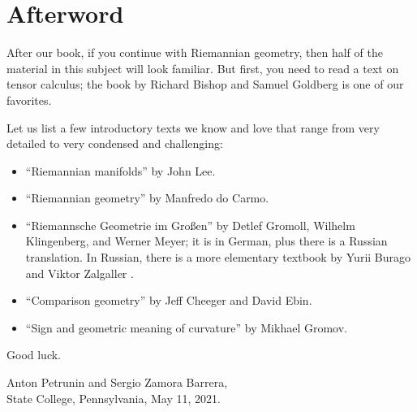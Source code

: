 \chapter{Afterword}

After our book, if you continue with Riemannian geometry,
then half of the material in this subject will look familiar.
But first, you need to read a text on tensor calculus;
the book by Richard Bishop and Samuel Goldberg \cite{bishop-goldberg} is one of our favorites.

Let us list a few introductory texts we know and love that range from very detailed to very condensed and challenging:
\begin{itemize}
\item ``Riemannian manifolds''  \cite{lee2006riemannian} by John Lee.
\item ``Riemannian geometry'' \cite{carmo1992riemannian} by Manfredo do Carmo.
\item ``Riemannsche Geometrie im Großen'' \cite{gromoll-klingenberg-meyer} by 
Detlef Gromoll,
Wilhelm Klingenberg, 
and  Werner Meyer;
it is in German, plus there is a Russian translation.
In Russian, there is a more elementary textbook by Yurii Burago and Viktor Zalgaller \cite{burago-zalgaller}.
\item ``Comparison geometry'' \cite{cheeger-ebin} by Jeff Cheeger and David Ebin. 
\item ``Sign and geometric meaning of curvature'' \cite{gromov-1991} by Mikhael Gromov.
\end{itemize}
Good luck.

\begin{flushright}
Anton Petrunin and Sergio Zamora Barrera,\\
State College, Pennsylvania, May 11, 2021.
\end{flushright}
